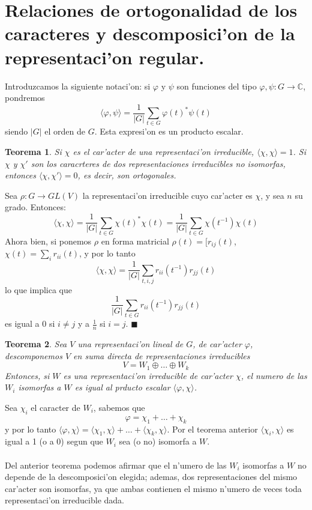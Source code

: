 \documentclass[a4paper,openright,12pt]{report}
\numberwithin{equation}{section} %
\newtheorem{teorema}{Teorema}[section] %
\newenvironment{proof}{\noindent{\it Demostracion:}}{\hfill$\blacksquare$} %
\begin{document}
\section{Relaciones de ortogonalidad de los caracteres y descomposici'on de la representaci'on regular.}
Introduzcamos la siguiente notaci'on: si $\varphi$ y $\psi$ son funciones del tipo $\varphi , \psi : G \rightarrow \mathbb{C}$, pondremos
\[
\langle \varphi , \psi \rangle = \frac{1}{|G|}\sum_{t \in G} \varphi (t)^{*} \psi (t)
\]
siendo $|G|$ el orden de $G$. Esta expresi'on es un producto escalar.
\begin{teorema}
Si $\chi$ es el car'acter de una representaci'on irreducible, $\langle \chi , \chi \rangle =1$. Si $\chi$ y $\chi'$ son los caracrteres de dos representaciones irreducibles no isomorfas, entonces $\langle \chi , \chi' \rangle=0$, es decir, son ortogonales.
\end{teorema}
\begin{proof}
Sea $\rho: G \rightarrow GL(V)$ la representaci'on irreducible cuyo car'acter es $\chi$, y sea $n$ su grado. Entonces:
\[
\langle \chi , \chi \rangle = \frac{1}{|G|}\sum_{t \in G} \chi (t)^{*} \chi (t)  = \frac{1}{|G|}\sum_{t \in G} \chi (t^{-1}) \chi (t) 
\]
Ahora bien, si ponemos $\rho$ en forma matricial $\rho(t)=[r_{ij}(t)$, $\chi (t) = \sum_{i} r_{ii}(t)$, y por lo tanto
\[
\langle \chi , \chi \rangle = \frac{1}{|G|}\sum_{t, i, j} r_{ii} (t^{-1}) r_{jj} (t) 
\]
lo que implica que
\[
\frac{1}{|G|}\sum_{t \in G} r_{ii} (t^{-1}) r_{jj} (t)
\]
es igual a 0 si $i \neq j$ y a $\frac{1}{n}$ si $i=j$.
\end{proof}
\begin{teorema}
Sea $V$ una representaci'on lineal de $G$, de car'acter $\varphi$, descomponemos $V$ en suma directa de representaciones irreducibles
\[
V = W_{1} \oplus \ldots \oplus W_{k}
\]
Entonces, si $W$ es una representaci'on irreducible de car'acter $\chi$, el numero de las $W_{i}$ isomorfas a $W$ es igual al prducto escalar $\langle \varphi , \chi \rangle$. 
\end{teorema}
Sea $\chi_{i}$ el caracter de $W_{i}$, sabemos que 
\[
\varphi = \chi_{1}+ \ldots + \chi_{k}
\]
y por lo tanto $\langle \varphi , \chi \rangle= \langle \chi_{1}, \chi \rangle +\ldots +   \langle \chi_{k}, \chi \rangle $. Por el teorema anterior $\langle \chi_{i}, \chi \rangle$ es igual a 1 (o a 0) segun que $W_{i}$ sea (o no) isomorfa a $W$.\\
\\
Del anterior teorema podemos afirmar que el n'umero de las $W_{i}$ isomorfas a $W$ no depende de la descomposici'on elegida; ademas, dos representaciones del mismo car'acter son isomorfas, ya que ambas contienen el mismo n'umero de veces toda representaci'on irreducible dada.\\
\end{document}

